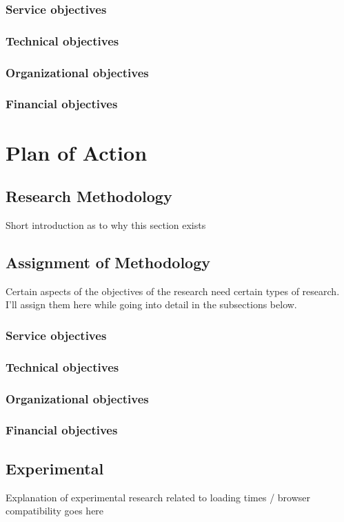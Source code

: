 \documentclass[signatures]{Thesis}
\begin{document}
  	\subsection{Service objectives}
    \subsection{Technical objectives}
    \subsection{Organizational objectives}
    \subsection{Financial objectives}

\chapter{Plan of Action}
  	\section{Research Methodology}
  	Short introduction as to why this section exists
  	\section{Assignment of Methodology}
    Certain aspects of the objectives of the research need certain types of research. I'll assign them here while going into detail in the subsections below.
	    \subsection{Service objectives}
	    \subsection{Technical objectives}
	    \subsection{Organizational objectives}
	    \subsection{Financial objectives}
    \section{Experimental}
    Explanation of experimental research related to loading times / browser compatibility goes here
\end{document}
